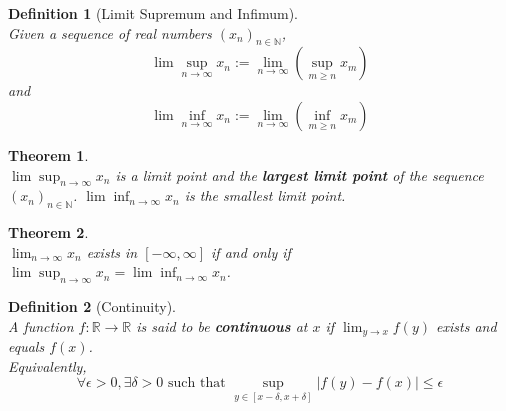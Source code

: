 \documentclass[12pt]{article}
\newtheorem{definition}{Definition}[section]
\newtheorem{theorem}{Theorem}[section]
\theoremstyle{definition}
\begin{document}
\begin{definition}[Limit Supremum and Infimum]
\hfill\\\normalfont Given a sequence of real numbers $(x_n)_{n\in \mathbb{N}}$,
\[
\lim\sup_{n\to\infty} x_n :=\lim_{n\to \infty}(\sup_{m\geq n} x_m)
\]
and 
\[
\lim\inf_{n\to\infty} x_n :=\lim_{n\to \infty}(\inf_{m\geq n} x_m)
\]
\end{definition}
\begin{theorem}
\hfill\\\normalfont $\lim\sup_{n\to \infty} x_n$ is a limit point and the \textbf{largest limit point} of the sequence $(x_n)_{n\in \mathbb{N}}$. $\lim\inf_{n\to \infty} x_n$ is the smallest limit point.
\end{theorem}
\begin{theorem}
\hfill\\\normalfont $\lim_{n\to\infty} x_n$ exists in $[-\infty,\infty]$ if and only if $\lim\sup_{n\to\infty} x_n = \lim\inf_{n\to\infty} x_n$.
\end{theorem}
\begin{definition}[Continuity]
\hfill\\\normalfont A function $f:\mathbb{R}\to\mathbb{R}$ is said to be \textbf{continuous} at $x$ if $\lim_{y\to x} f(y)$ exists and equals $f(x)$.\\
Equivalently,
\[
\forall \epsilon>0, \exists \delta>0\text{ such that } \sup_{y\in[x-\delta, x+\delta]}|f(y)-f(x)|\leq \epsilon
\]
\end{definition}
\end{document}
